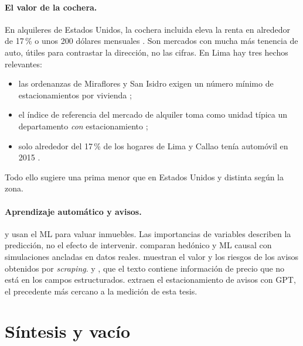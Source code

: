 \paragraph{El valor de la cochera.} En alquileres de Estados Unidos, la cochera incluida eleva la renta en alrededor de 17\,\% \citep{gabbe2017} o unos 200 dólares mensuales \citep{manville2013}. Son mercados con mucha más tenencia de auto, útiles para contrastar la dirección, no las cifras. En Lima hay tres hechos relevantes:
\begin{itemize}[leftmargin=*]
\item las ordenanzas de Miraflores y San Isidro exigen un número mínimo de estacionamientos por vivienda \citep{miraflores2011,sanisidro2020};
\item el índice de referencia del mercado de alquiler toma como unidad típica un departamento \emph{con} estacionamiento \citep{urbania2025};
\item solo alrededor del 17\,\% de los hogares de Lima y Callao tenía automóvil en 2015 \citep{limacomovamos2016}.
\end{itemize}
Todo ello sugiere una prima menor que en Estados Unidos y distinta según la zona.

\paragraph{Aprendizaje automático y avisos.} \citet{tapia2025} y \citet{gyger2026} usan el ML para valuar inmuebles. Las importancias de variables describen la predicción, no el efecto de intervenir. \citet{chen2026} comparan hedónico y ML causal con simulaciones ancladas en datos reales. \citet{boeing2017} muestran el valor y los riesgos de los avisos obtenidos por \textit{scraping}. \citet{nowak2017} y \citet{shen2021}, que el texto contiene información de precio que no está en los campos estructurados. \citet{faxvaag2026} extraen el estacionamiento de avisos con GPT, el precedente más cercano a la medición de esta tesis.

\section{Síntesis y vacío}

